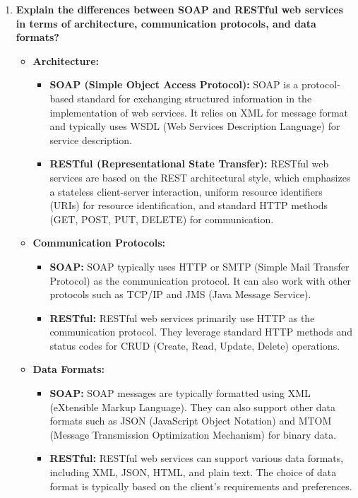 \documentclass[11pt]{article}
\begin{document}
\begin{enumerate}
    \item \textbf{Explain the differences between SOAP and RESTful web services in terms of architecture, communication protocols, and data formats?}\\
          \begin{itemize}
              \item \textbf{Architecture:}
                    \begin{itemize}
                        \item \textbf{SOAP (Simple Object Access Protocol):} SOAP is a protocol-based standard for exchanging structured information in the implementation of web services. It relies on XML for message format and typically uses WSDL (Web Services Description Language) for service description.
                        \item \textbf{RESTful (Representational State Transfer):} RESTful web services are based on the REST architectural style, which emphasizes a stateless client-server interaction, uniform resource identifiers (URIs) for resource identification, and standard HTTP methods (GET, POST, PUT, DELETE) for communication.
                    \end{itemize}
              \item \textbf{Communication Protocols:}
                    \begin{itemize}
                        \item \textbf{SOAP:} SOAP typically uses HTTP or SMTP (Simple Mail Transfer Protocol) as the communication protocol. It can also work with other protocols such as TCP/IP and JMS (Java Message Service).
                        \item \textbf{RESTful:} RESTful web services primarily use HTTP as the communication protocol. They leverage standard HTTP methods and status codes for CRUD (Create, Read, Update, Delete) operations.
                    \end{itemize}
              \item \textbf{Data Formats:}
                    \begin{itemize}
                        \item \textbf{SOAP:} SOAP messages are typically formatted using XML (eXtensible Markup Language). They can also support other data formats such as JSON (JavaScript Object Notation) and MTOM (Message Transmission Optimization Mechanism) for binary data.
                        \item \textbf{RESTful:} RESTful web services can support various data formats, including XML, JSON, HTML, and plain text. The choice of data format is typically based on the client's requirements and preferences.

\end{itemize}
\end{itemize}
\end{enumerate}
\end{document}
